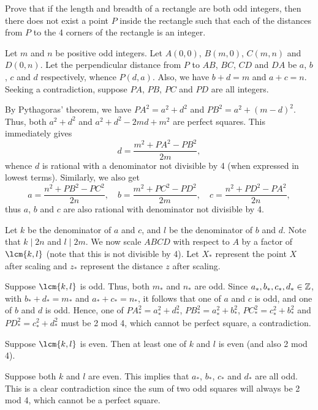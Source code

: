 \begin{question}\label{A::2022-O-2-2}
    Prove that if the length and breadth of a rectangle are both odd integers, then there does not exist a point $P$ inside the rectangle such that each of the distances from $P$ to the 4 corners of the rectangle is an integer.
\end{question}
\begin{solution*}
    Let $m$ and $n$ be positive odd integers. Let $A(0, 0)$, $B(m, 0)$, $C(m, n)$ and $D(0, n)$. Let the perpendicular distance from $P$ to $AB$, $BC$, $CD$ and $DA$ be $a$, $b$, $c$ and $d$ respectively, whence $P(d, a)$. Also, we have $b + d = m$ and $a + c = n$. Seeking a contradiction, suppose $PA$, $PB$, $PC$ and $PD$ are all integers.

    By Pythagoras' theorem, we have $PA^2 = a^2 + d^2$ and $PB^2 = a^2 + (m-d)^2$. Thus, both $a^2 + d^2$ and $a^2 + d^2 - 2md + m^2$ are perfect squares. This immediately gives \[d = \frac{m^2 + PA^2 - PB^2}{2m},\] whence $d$ is rational with a denominator not divisible by 4 (when expressed in lowest terms). Similarly, we also get \[a = \frac{n^2 + PB^2 - PC^2}{2n}, \quad b = \frac{m^2 + PC^2 - PD^2}{2m}, \quad c = \frac{n^2 + PD^2 - PA^2}{2n},\] thus $a$, $b$ and $c$ are also rational with denominator not divisible by 4.

    Let $k$ be the denominator of $a$ and $c$, and $l$ be the denominator of $b$ and $d$. Note that $k \mid 2n$ and $l \mid 2m$. We now scale $ABCD$ with respect to $A$ by a factor of $\lcm{k, l}$ (note that this is not divisible by 4). Let $X_\ast$ represent the point $X$ after scaling and $z_\ast$ represent the distance $z$ after scaling.

     Suppose $\lcm{k, l}$ is odd. Thus, both $m_\ast$ and $n_\ast$ are odd. Since $a_\ast, b_\ast, c_\ast, d_\ast \in \mathbb{Z}$, with $b_\ast + d_\ast = m_\ast$ and $a_\ast + c_\ast = n_\ast$, it follows that one of $a$ and $c$ is odd, and one of $b$ and $d$ is odd. Hence, one of $PA_\ast^2 = a_\ast^2 + d_\ast^2$, $PB_\ast^2 = a_\ast^2 + b_\ast^2$, $PC_\ast^2 = c_\ast^2 + b_\ast^2$ and $PD_\ast^2 = c_\ast^2 + d_\ast^2$ must be 2 mod 4, which cannot be perfect square, a contradiction.

     Suppose $\lcm{k, l}$ is even. Then at least one of $k$ and $l$ is even (and also 2 mod 4). 

     Suppose both $k$ and $l$ are even. This implies that $a_\ast$, $b_\ast$, $c_\ast$ and $d_\ast$ are all odd. This is a clear contradiction since the sum of two odd squares will always be 2 mod 4, which cannot be a perfect square.


\end{solution*}
